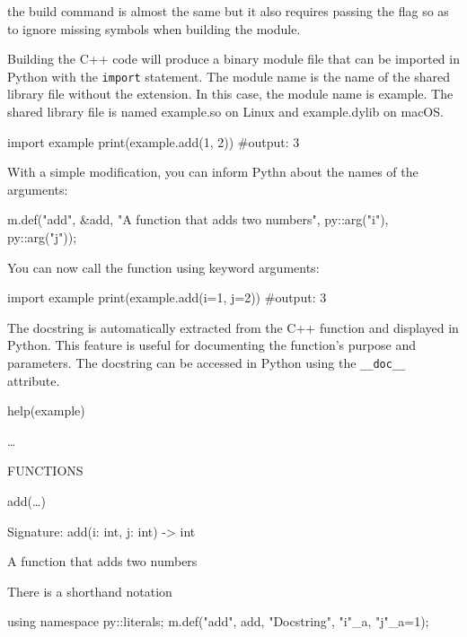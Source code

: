 \begin{warningblock}[On macOS]
    the build command is almost the same but it also requires passing the  flag so as to ignore missing symbols when building the module.
\end{warningblock}

Building the C++ code will produce a binary module file that can be imported in Python with the \texttt{import} statement. The module name is the name of the shared library file without the extension. In this case, the module name is example. The shared library file is named example.so on Linux and example.dylib on macOS.

\begin{codeblock}[language=python]
import example
print(example.add(1, 2)) #output: 3
\end{codeblock}

With a simple modification, you can inform Pythn about the names of the arguments:

\begin{codeblock}[language=C++]
m.def("add", &add, "A function that adds two numbers", 
py::arg("i"), py::arg("j"));
\end{codeblock}

You can now call the function using keyword arguments:

\begin{codeblock}[language=python]
import example
print(example.add(i=1, j=2)) #output: 3
\end{codeblock}

\begin{observationblock}[Documentation]
    The docstring is automatically extracted from the C++ function and displayed in Python. This
    feature is useful for documenting the function's purpose and parameters. The docstring can be
    accessed in Python using the \texttt{\_\_doc\_\_} attribute.

    help(example) 

    \dots 

    FUNCTIONS

        add(\dots)

            Signature: add(i: int, j: int) -> int


            A function that adds two numbers
\end{observationblock}

There is a shorthand notation 

\begin{codeblock}[language=C++]
using namespace py::literals;
m.def("add", add, "Docstring", "i"_a, "j"_a=1);
\end{codeblock}


